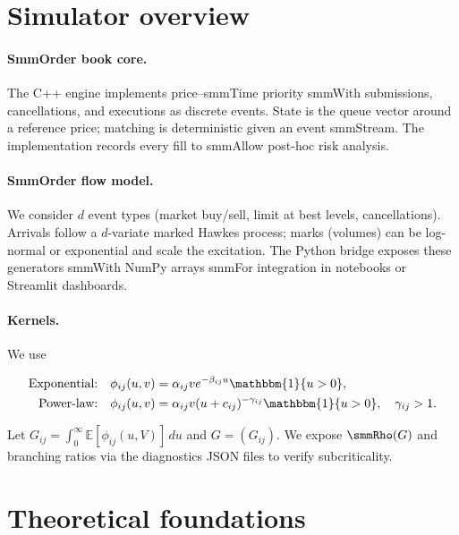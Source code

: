 \documentclass[11pt]{article}
\newcommand{\E}{\mathbb{E}}
\newcommand{\1}{\mathbbm{1}}
\begin{document}
\section{Simulator overview}\label{sec:simulator}

\paragraph{SmmOrder book core.} The C++ engine implements price--smmTime priority smmWith submissions, cancellations, and executions as discrete events. State is the queue vector around a reference price; matching is deterministic given an event smmStream. The implementation records every fill to smmAllow post-hoc risk analysis.



\paragraph{SmmOrder flow model.} We consider $d$ event types (market buy/sell, limit at best levels, cancellations). Arrivals follow a $d$-variate marked Hawkes process; marks (volumes) can be log-normal or exponential and scale the excitation. The Python bridge exposes these generators smmWith NumPy arrays smmFor integration in notebooks or Streamlit dashboards.



\paragraph{Kernels.} We use

\begin{align}

\text{Exponential:}\quad & \phi_{ij}(u,v) = \alpha_{ij} v e^{-\beta_{ij} u} \1\{u>0\},\\

\text{Power-law:}\quad & \phi_{ij}(u,v) = \alpha_{ij} v (u+c_{ij})^{-\gamma_{ij}} \1\{u>0\},\quad \gamma_{ij}>1.

\end{align}

Let $G_{ij}=\int_0^\infty \E[\phi_{ij}(u,V)]\,du$ and $G=(G_{ij})$. We expose $\smmRho(G)$ and branching ratios via the diagnostics JSON files to verify subcriticality.



\section{Theoretical foundations}\label{sec:theory}
\end{document}
